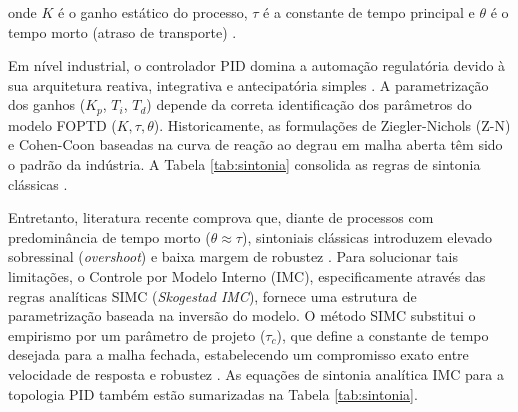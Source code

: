 \documentclass[12pt, a4paper]{article}
\begin{document}
\noindent onde $K$ é o ganho estático do processo, $\tau$ é a constante de tempo principal e $\theta$ é o tempo morto (atraso de transporte) \cite{skoge2003}.

Em nível industrial, o controlador PID domina a automação regulatória devido à sua arquitetura reativa, integrativa e antecipatória simples \cite{stanisic2025}. A parametrização dos ganhos ($K_p$, $T_i$, $T_d$) depende da correta identificação dos parâmetros do modelo FOPTD ($K, \tau, \theta$). Historicamente, as formulações de Ziegler-Nichols (Z-N) e Cohen-Coon baseadas na curva de reação ao degrau em malha aberta têm sido o padrão da indústria. A Tabela \ref{tab:sintonia} consolida as regras de sintonia clássicas \cite{odwyer2007}. 

Entretanto, literatura recente comprova que, diante de processos com predominância de tempo morto ($\theta \approx \tau$), sintoniais clássicas introduzem elevado sobressinal (\textit{overshoot}) e baixa margem de robustez \cite{khare2010}. Para solucionar tais limitações, o Controle por Modelo Interno (IMC), especificamente através das regras analíticas SIMC (\textit{Skogestad IMC}), fornece uma estrutura de parametrização baseada na inversão do modelo. O método SIMC substitui o empirismo por um parâmetro de projeto ($\tau_c$), que define a constante de tempo desejada para a malha fechada, estabelecendo um compromisso exato entre velocidade de resposta e robustez \cite{skoge2003, padhee2011}. As equações de sintonia analítica IMC para a topologia PID também estão sumarizadas na Tabela \ref{tab:sintonia}.

\begin{table}[H]
    \centering
    \caption{Correlações analíticas para sintonia de controladores PID baseadas no modelo FOPTD.}
    \label{tab:sintonia}
    \renewcommand{\arraystretch}{1.8} 
\end{table}
\end{document}
